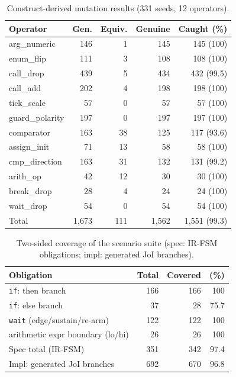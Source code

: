 \documentclass[sigconf,nonacm,anonymous,review]{acmart}
\begin{document}
\begin{table}[t]
\centering
\caption{Construct-derived mutation results (331 seeds, 12 operators).}
\label{tab:mutation}
\small
\setlength{\tabcolsep}{4.5pt}
\begin{tabular}{lrrrr}
\toprule
Operator & Gen. & Equiv. & Genuine & Caught (\%) \\
\midrule
arg\_numeric    & 146 & 1  & 145 & 145 (100) \\
enum\_flip      & 111 & 3  & 108 & 108 (100) \\
call\_drop      & 439 & 5  & 434 & 432 (99.5) \\
call\_add       & 202 & 4  & 198 & 198 (100) \\
tick\_scale     & 57  & 0  & 57  & 57 (100) \\
guard\_polarity & 197 & 0  & 197 & 197 (100) \\
comparator      & 163 & 38 & 125 & 117 (93.6) \\
assign\_init    & 71  & 13 & 58  & 58 (100) \\
cmp\_direction  & 163 & 31 & 132 & 131 (99.2) \\
arith\_op       & 42  & 12 & 30  & 30 (100) \\
break\_drop     & 28  & 4  & 24  & 24 (100) \\
wait\_drop      & 54  & 0  & 54  & 54 (100) \\
\midrule
Total           & 1,673 & 111 & 1,562 & 1,551 (99.3) \\
\bottomrule
\end{tabular}
\end{table}

\begin{table}[t]
\centering
\caption{Two-sided coverage of the scenario suite (spec: IR-FSM obligations; impl: generated JoI branches).}
\label{tab:coverage}
\small
\begin{tabular}{lrrr}
\toprule
Obligation & Total & Covered & (\%) \\
\midrule
\texttt{if}: then branch            & 166 & 166 & 100 \\
\texttt{if}: else branch            & 37  & 28  & 75.7 \\
\texttt{wait} (edge/sustain/re-arm) & 122 & 122 & 100 \\
arithmetic expr boundary (lo/hi)    & 26  & 26  & 100 \\
\midrule
Spec total (IR-FSM)                 & 351 & 342 & 97.4 \\
Impl: generated JoI branches        & 692 & 670 & 96.8 \\
\bottomrule
\end{tabular}
\end{table}
\end{document}
